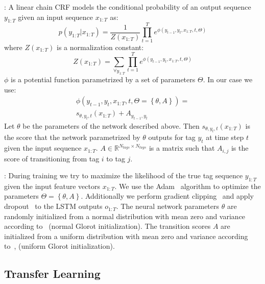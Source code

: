 \documentclass[11pt,letterpaper]{article}
\begin{document}
: A linear chain CRF models the
conditional probability of an output sequence $y_{1:T}$ given an input sequence
$x_{1:T}$ as:
\begin{equation}
    p\left(y_{1:T} | x_{1:T}\right) = \frac{1}{Z(x_{1:T})}\prod_{t = 1}^{T}e^{\phi\left(y_{t - 1}, y_{t}, x_{1:T}, t, \Theta\right)}
\end{equation}
where $Z\left(x_{1:T}\right)$ is a normalization constant:
\begin{equation}
    Z\left(x_{1:T}\right) = \sum_{\forall y_{1:T}}\prod_{t=1}^{T}e^{\phi\left(y_{t - 1}, y_{t}, x_{1:T}, t, \Theta\right)}
\end{equation}
$\phi$ is a potential function parametrized by a set of parameters $\Theta$. In
our case we use:
\begin{equation}
\begin{aligned}
    \phi\left(y_{t - 1}, y_{t}, x_{1:T}, t, \Theta = \left\{\theta, A\right\}\right) = \\
    s_{\theta, y_t, t}\left(x_{1:T}\right) + A_{y_{t - 1}, y_{t}}
\end{aligned}
\end{equation}
Let $\theta$ be the parameters of the network described above. Then 
$s_{\theta, y_t, t}\left(x_{1:T}\right)$ is the score that the network parametrized
by $\theta$ outputs for tag $y_{t}$ at time step $t$ given the input sequence $x_{1:T}$.
$A \in \mathbb{R}^{N_{tags} \times N_{tags}}$ is a matrix such that $A_{i, j}$
is the score of transitioning from tag $i$ to tag $j$. 

: During training we try to maximize the
likelihood of the true tag sequence $y_{1:T}$ given the input feature vectors
$x_{1:T}$. We use the Adam~\cite{adam} algorithm to optimize the parameters
$\Theta = \left\{\theta, A\right\}$. Additionally we perform gradient clipping~\cite{gradient_clipping}
and apply dropout~\cite{dropout} to the LSTM outputs $o_{1:T}$. The neural
network parameters $\theta$ are randomly initialized from a normal distribution
with mean zero and variance according to~\cite{xavier_init} (normal Glorot initialization).
The transition scores $A$ are initialized from a uniform distribution with mean zero and variance
according to~\cite{xavier_init}, (uniform Glorot initialization).

\subsection{Transfer Learning}
\label{sec:transfer}
\end{document}
